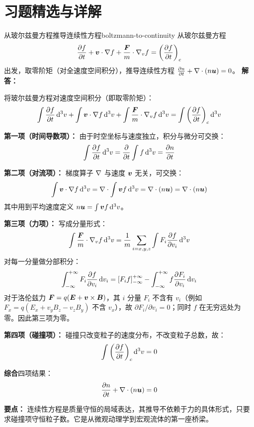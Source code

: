 ﻿%

\section*{习题精选与详解}

\begin{example}{从玻尔兹曼方程推导连续性方程}{boltzmann-to-continuity}
从玻尔兹曼方程
\[
\frac{\partial f}{\partial t} + \bm{v}\cdot\nabla f + \frac{\bm{F}}{m}\cdot\nabla_v f = \left(\frac{\partial f}{\partial t}\right)_c
\]
出发，取零阶矩（对全速度空间积分），推导连续性方程 $\frac{\partial n}{\partial t} + \nabla\cdot(n\bm{u}) = 0$。
\tcblower
\textbf{解答：}

将玻尔兹曼方程对速度空间积分（即取零阶矩）：
\[
\int\frac{\partial f}{\partial t}\,\mathrm{d}^3 v + \int\bm{v}\cdot\nabla f\,\mathrm{d}^3 v + \int\frac{\bm{F}}{m}\cdot\nabla_v f\,\mathrm{d}^3 v = \int\left(\frac{\partial f}{\partial t}\right)_c\mathrm{d}^3 v
\]

\textbf{第一项（时间导数项）：} 由于时空坐标与速度独立，积分与微分可交换：
\[
\int\frac{\partial f}{\partial t}\,\mathrm{d}^3 v = \frac{\partial}{\partial t}\int f\,\mathrm{d}^3 v = \frac{\partial n}{\partial t}
\]

\textbf{第二项（对流项）：} 梯度算子 $\nabla$ 与速度 $\bm{v}$ 无关，可交换：
\[
\int\bm{v}\cdot\nabla f\,\mathrm{d}^3 v = \nabla\cdot\int\bm{v}f\,\mathrm{d}^3 v = \nabla\cdot(n\bm{u}) = \nabla\cdot(n\bm{u})
\]
其中用到平均速度定义 $n\bm{u} = \int\bm{v}f\,\mathrm{d}^3 v$。

\textbf{第三项（力项）：} 写成分量形式：
\[
\int\frac{\bm{F}}{m}\cdot\nabla_v f\,\mathrm{d}^3 v = \frac{1}{m}\sum_{i=x,y,z}\int F_i\frac{\partial f}{\partial v_i}\,\mathrm{d}^3 v
\]
对每一分量做分部积分：
\[
\int_{-\infty}^{+\infty} F_i\frac{\partial f}{\partial v_i}\,\mathrm{d} v_i = \left[F_i f\right]_{-\infty}^{+\infty} - \int_{-\infty}^{+\infty} f\frac{\partial F_i}{\partial v_i}\,\mathrm{d} v_i
\]
对于洛伦兹力 $\bm{F} = q(\bm{E} + \bm{v}\times\bm{B})$，其 $i$ 分量 $F_i$ 不含有 $v_i$（例如 $F_x = q(E_x + v_y B_z - v_z B_y)$ 不含 $v_x$），故 $\partial F_i/\partial v_i = 0$；同时 $f$ 在无穷远处为零。因此第三项为零。

\textbf{第四项（碰撞项）：} 碰撞只改变粒子的速度分布，不改变粒子总数，故：
\[
\int\left(\frac{\partial f}{\partial t}\right)_c\mathrm{d}^3 v = 0
\]

\textbf{综合}四项结果：
\[
\frac{\partial n}{\partial t} + \nabla\cdot(n\bm{u}) = 0
\]

\textbf{要点：} 连续性方程是质量守恒的局域表达，其推导不依赖于力的具体形式，只要求碰撞项守恒粒子数。它是从微观动理学到宏观流体的第一座桥梁。
\end{example}


